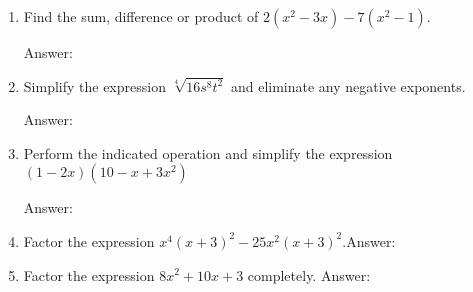 \documentclass[11pt]{article}
\begin{document}
\begin{enumerate}
\vfill
\newpage


\item Find the sum, difference or product of  $ 2(x^2-3x)-7(x^2-1).$\\
 \begin{flushright}{Answer: \underline{\hspace{2in}}}\end{flushright}
 
\vfill

\item Simplify the expression $\sqrt[4]{16s^8t^2}$ and eliminate any negative exponents.\\
\begin{flushright}{Answer: \underline{\hspace{2in}}}\end{flushright}

\vfill


\item Perform the indicated operation and simplify the expression $(1-2x)(10-x+3x^2)$\\
\begin{flushright}{Answer: \underline{\hspace{2in}}}\end{flushright}

\vfill

\item Factor the expression $x^4(x+3)^2-25x^2(x+3)^2.$\hfill Answer: \underline{\hspace{2in}}\\
\vfill


\item Factor the expression $8x^2+10x+3$ completely. \hfill Answer: \underline{\hspace{2in}}\\
\vfill




\end{enumerate}
\end{document}
